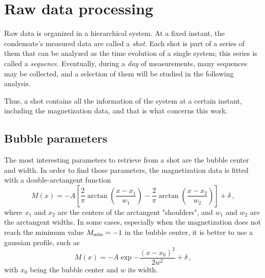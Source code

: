\section{Raw data processing}
Raw data is organized in a hierarchical system. At a fixed instant, the condensate's measured data are called a \textit{shot}. Each shot is part of a series of them that can be analyzed as the time evolution of a single system; this series is called a \textit{sequence}. Eventually, during a \textit{day} of measurements, many sequences may be collected, and a selection of them will be studied in the following analysis.

Thus, a shot contains all the information of the system at a certain instant, including the magnetization data, and that is what concerns this work.

\subsection{Bubble parameters}
The most interesting parameters to retrieve from a shot are the bubble center and width.
In order to find those parameters, the magnetization data is fitted with a double-arctangent function
\begin{equation*}
    M(x) = -A \left[\frac{2}{\pi}\arctan(\frac{x-x_1}{w_1}) - \frac{2}{\pi}\arctan(\frac{x-x_2}{w_2})\right] + \delta\, ,
\end{equation*}
where $x_1$ and $x_2$ are the centers of the arctangent "shoulders", and $w_1$ and $w_2$ are the arctangent widths.
In some cases, especially when the magnetization does not reach the minimum value $M_{\rm min} = -1$ in the bubble center, it is better to use a gaussian profile, such as
\begin{equation*}
    M(x) = - A \exp{-\frac{(x-x_0)^2}{2w^2}} + \delta\, ,
\end{equation*}
with $x_0$ being the bubble center and $w$ its width.
